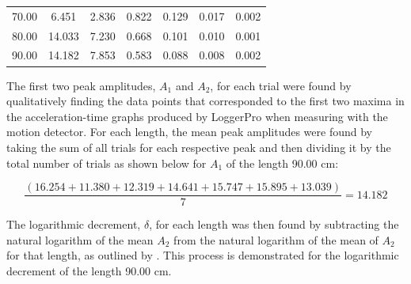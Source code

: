 \documentclass[12pt]{article}
\begin{document}
\begin{table}[H]
\begin{tabular}{|ccccccc|}
70.00                                                                         & 6.451                                                                                 & 2.836                                                                           & 0.822                                                                            & 0.129                                                                       & 0.017                                                 & 0.002 \\
\rowcolor[HTML]{EFEFEF} 
80.00 
& 14.033                                                                                & 7.230                                                                           & 0.668                                                                            & 0.101                                                                       & 0.010                                                 & 0.001 \\
90.00                                                                         & 14.182                                                                                & 7.853                                                                           & 0.583                                                                            & 0.088                                                                       & 0.008                                                 & 0.002 \\ \hline
\end{tabular}
\end{table}

The first two peak amplitudes, $A_1$ and $A_2$, for each trial were found by qualitatively finding the data points that corresponded to the first two maxima in the acceleration-time graphs produced by LoggerPro when measuring with the motion detector. For each length, the mean peak amplitudes were found by taking the sum of all trials for each respective peak and then dividing it by the total number of trials as shown below for $A_1$ of the length 90.00 cm:

\begin{equation}
    \frac{(16.254 + 11.380 + 12.319 + 14.641 + 15.747 + 15.895 + 13.039)}{7} = 14.182
\end{equation}

The logarithmic decrement, $\delta$, for each length was then found by subtracting the natural logarithm of the mean $A_2$ from the natural logarithm of the mean of $A_2$ for that length, as outlined by \citeauthor{miller_mattuck}. This process is demonstrated for the logarithmic decrement of the length 90.00 cm.
\end{document}
